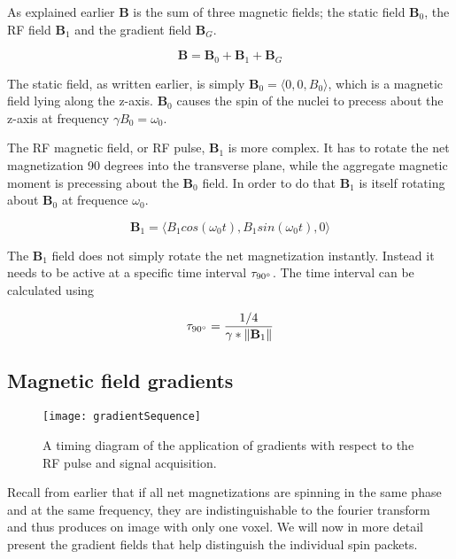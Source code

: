 

As explained earlier $\mathbf{B}$ is the sum of three magnetic fields;
the static field $\mathbf{B}_0$, the RF field $\mathbf{B}_1$ and the
gradient field $\mathbf{B}_G$.

\begin{displaymath}
  \mathbf{B} = \mathbf{B}_0 + \mathbf{B}_1 + \mathbf{B}_G
\end{displaymath}

The static field, as written earlier, is simply $\mathbf{B}_0 =
\langle 0, 0, B_0 \rangle$, which is a magnetic field lying along the
z-axis. $\mathbf{B}_0$ causes the spin of the nuclei to precess about
the z-axis at frequency $\gamma B_0 = \omega_0$.

The RF magnetic field, or RF pulse, $\mathbf{B}_1$ is more complex. It
has to rotate the net magnetization 90 degrees into the transverse
plane, while the aggregate magnetic moment is precessing about the
$\mathbf{B}_0$ field. In order to do that $\mathbf{B}_1$ is itself
rotating about $\mathbf{B}_0$ at frequence $\omega_0$.

\begin{displaymath}
  \mathbf{B}_1 = \langle B_1 cos(\omega_0 t), B_1 sin(\omega_0 t), 0\rangle
\end{displaymath}

The $\mathbf{B}_1$ field does not simply rotate the net magnetization
instantly. Instead it needs to be active at a specific time interval
$\tau_{90^\circ}$. The time interval can be calculated using

\begin{displaymath}
  \tau_{90^\circ} = \frac{1 / 4}{\gamma * \|\mathbf{B}_1\|}
\end{displaymath}

\subsection{Magnetic field gradients}

\begin{figure}
  \centering
  \texttt{[image: gradientSequence]}
  \caption{A timing diagram of the application of gradients with
    respect to the RF pulse and signal acquisition.}
  \label{fig:gradientSequence}
\end{figure}

Recall from earlier that if all net magnetizations are spinning in the
same phase and at the same frequency, they are indistinguishable to
the fourier transform and thus produces on image with only one
voxel. We will now in more detail present the gradient fields that
help distinguish the individual spin packets.

